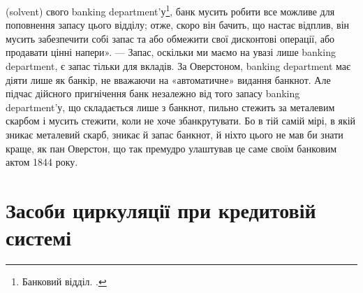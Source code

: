 \parcont{}  %
(solvent) свого banking department’у\footnote*{
Банковий відділ. .
}, банк мусить робити все можливе для поповнення запасу цього
відділу; отже, скоро він бачить, що настає відплив, він мусить забезпечити собі запас та або
обмежити свої дисконтові операції, або продавати цінні
напери». — Запас, оскільки ми маємо на увазі лише banking department, є запас
тільки для вкладів. За Оверстоном, banking department має діяти лише як банкір,
не вважаючи на «автоматичне» видання банкнот. Але підчас дійсного пригнічення
банк незалежно від того запасу banking department'у, що складається лише з
банкнот, пильно стежить за металевим скарбом і мусить стежити, коли не хоче
збанкрутувати. Бо в тій самій мірі, в якій зникає металевий скарб, зникає й
запас банкнот, й ніхто цього не мав би знати краще, як пан Оверстон, що так
премудро улаштував це саме своїм банковим актом 1844 року.

\section{Засоби циркуляції при кредитовій системі}


